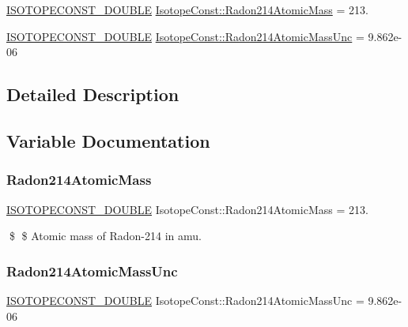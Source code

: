 \begin{DoxyCompactItemize}
\item 
\mbox{\hyperlink{group___isotope_const-_macros_ga8f45a7272ce02c0b4c65c44636ed719a}{I\+S\+O\+T\+O\+P\+E\+C\+O\+N\+S\+T\+\_\+\+D\+O\+U\+B\+LE}} \mbox{\hyperlink{group___isotope_const-_radon-_rn214_gae6ceb7253e43f38ad8a2c3bc7bffdea1}{Isotope\+Const\+::\+Radon214\+Atomic\+Mass}} = 213.
\item 
\mbox{\hyperlink{group___isotope_const-_macros_ga8f45a7272ce02c0b4c65c44636ed719a}{I\+S\+O\+T\+O\+P\+E\+C\+O\+N\+S\+T\+\_\+\+D\+O\+U\+B\+LE}} \mbox{\hyperlink{group___isotope_const-_radon-_rn214_gaf6b77b9163d30bc89e935089a1f7cdcd}{Isotope\+Const\+::\+Radon214\+Atomic\+Mass\+Unc}} = 9.\+862e-\/06
\end{DoxyCompactItemize}


\subsection{Detailed Description}


\subsection{Variable Documentation}
\mbox{\label{group___isotope_const-_radon-_rn214_gae6ceb7253e43f38ad8a2c3bc7bffdea1}} 
\subsubsection{\texorpdfstring{Radon214\+Atomic\+Mass}{Radon214AtomicMass}}
{\footnotesize\ttfamily \mbox{\hyperlink{group___isotope_const-_macros_ga8f45a7272ce02c0b4c65c44636ed719a}{I\+S\+O\+T\+O\+P\+E\+C\+O\+N\+S\+T\+\_\+\+D\+O\+U\+B\+LE}} Isotope\+Const\+::\+Radon214\+Atomic\+Mass = 213.}

\$ \$ Atomic mass of Radon-\/214 in amu. \mbox{\label{group___isotope_const-_radon-_rn214_gaf6b77b9163d30bc89e935089a1f7cdcd}} 
\subsubsection{\texorpdfstring{Radon214\+Atomic\+Mass\+Unc}{Radon214AtomicMassUnc}}
{\footnotesize\ttfamily \mbox{\hyperlink{group___isotope_const-_macros_ga8f45a7272ce02c0b4c65c44636ed719a}{I\+S\+O\+T\+O\+P\+E\+C\+O\+N\+S\+T\+\_\+\+D\+O\+U\+B\+LE}} Isotope\+Const\+::\+Radon214\+Atomic\+Mass\+Unc = 9.\+862e-\/06}


